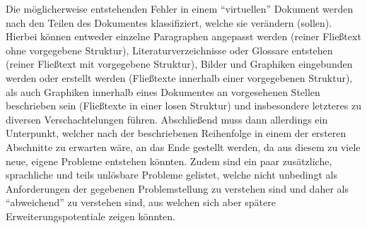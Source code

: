 % 
Die möglicherweise entstehenden Fehler in einem \enquote{virtuellen} Dokument werden nach den Teilen des Dokumentes klassifiziert, welche sie verändern (sollen). Hierbei können entweder einzelne Paragraphen angepasst werden (reiner Fließtext ohne vorgegebene Struktur),%
Literaturverzeichnisse oder Glossare entstehen (reiner Fließtext mit vorgegebene Struktur),%
Bilder und Graphiken eingebunden werden oder erstellt werden (Fließtexte innerhalb einer vorgegebenen Struktur),%
als auch Graphiken innerhalb eines Dokumentes an vorgesehenen Stellen beschrieben sein (Fließtexte in einer losen Struktur) und insbesondere letzteres zu diversen Verschachtelungen führen.%
Abschließend muss dann allerdings ein Unterpunkt, welcher nach der beschriebenen Reihenfolge in einem der ersteren Abschnitte zu erwarten wäre, an das Ende gestellt werden, da aus diesem zu viele neue, eigene Probleme entstehen könnten.%
Zudem sind ein paar zusätzliche, sprachliche und teils unlösbare Probleme gelistet, welche nicht unbedingt als Anforderungen der gegebenen Problemstellung zu verstehen sind und daher als \enquote{abweichend} zu verstehen sind, aus welchen sich aber spätere Erweiterungspotentiale zeigen könnten.

